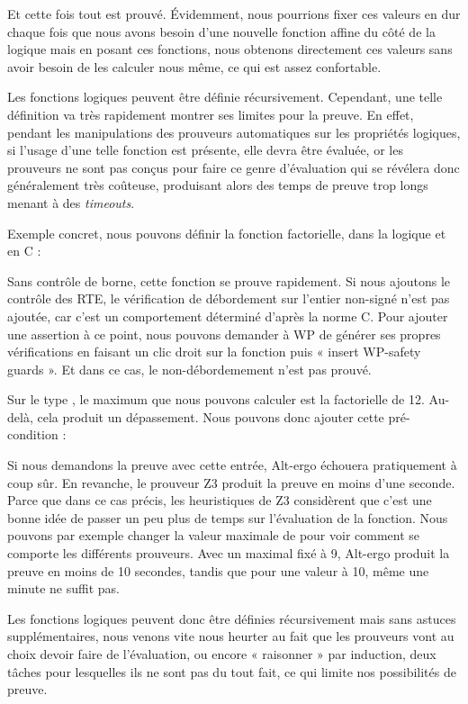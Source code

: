 Et cette fois tout est prouvé. Évidemment, nous pourrions fixer ces valeurs en 
dur chaque fois que nous avons besoin d'une nouvelle fonction affine du côté de
la logique mais en posant ces fonctions, nous obtenons directement ces valeurs 
sans avoir besoin de les calculer nous même, ce qui est assez confortable.





Les fonctions logiques peuvent être définie récursivement. Cependant, une telle
définition va très rapidement montrer ses limites pour la preuve. En effet, 
pendant les manipulations des prouveurs automatiques sur les propriétés 
logiques, si l'usage d'une telle fonction est présente, elle devra être évaluée,
or les prouveurs ne sont pas conçus pour faire ce genre d'évaluation qui se 
révélera donc généralement très coûteuse, produisant alors des temps de preuve
trop longs menant à des \textit{timeouts}.



Exemple concret, nous pouvons définir la fonction factorielle, dans la logique
et en C :






Sans contrôle de borne, cette fonction se prouve rapidement. Si nous ajoutons
le contrôle des RTE, le vérification de débordement sur l'entier non-signé n'est
pas ajoutée, car c'est un comportement déterminé d'après la norme C. Pour ajouter
une assertion à ce point, nous pouvons demander à WP de générer ses propres 
vérifications en faisant un clic droit sur la fonction puis « insert WP-safety 
guards ». Et dans ce cas, le non-débordemement n'est pas prouvé.



Sur le type , le maximum que nous pouvons calculer est la factorielle de 
12. Au-delà, cela produit un dépassement. Nous pouvons donc ajouter cette 
pré-condition :






Si nous demandons la preuve avec cette entrée, Alt-ergo échouera pratiquement à 
coup sûr. En revanche, le prouveur Z3 produit la preuve en moins d'une seconde.
Parce que dans ce cas précis, les heuristiques de Z3 considèrent que c'est une
bonne idée de passer un peu plus de temps sur l'évaluation de la fonction. Nous
pouvons par exemple changer la valeur maximale de  pour voir comment se 
comporte les différents prouveurs. Avec un  maximal fixé à 9, Alt-ergo produit
la preuve en moins de 10 secondes, tandis que pour une valeur à 10, même une 
minute ne suffit pas.



Les fonctions logiques peuvent donc être définies récursivement mais sans astuces
supplémentaires, nous venons vite nous heurter au fait que les prouveurs vont au 
choix devoir faire de l'évaluation, ou encore « raisonner » par induction, deux 
tâches pour lesquelles ils ne sont pas du tout fait, ce qui limite nos 
possibilités de preuve.
